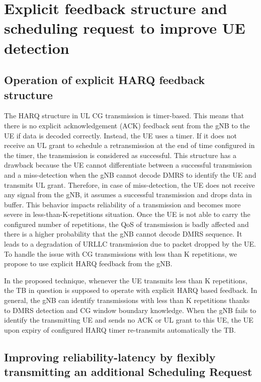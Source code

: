 \documentclass{report}
\begin{document}
\section{Explicit feedback structure and scheduling request to improve UE detection}\label{33}

\subsection{Operation of explicit HARQ feedback structure}\label{331}

The HARQ structure in UL CG transmission is timer-based. This means that there is no explicit acknowledgement (ACK) feedback sent from the gNB to the UE if data is decoded correctly. Instead, the UE uses a timer. If it does not receive an UL grant to schedule a retransmission at the end of time configured in the timer, the transmission is considered as successful. This structure has a drawback because the UE cannot differentiate between a successful transmission and a miss-detection when the gNB cannot decode DMRS to identify the UE and transmits UL grant. Therefore, in case of miss-detection, the UE does not receive any signal from the gNB, it assumes a successful transmission and drops data in buffer. This behavior impacts reliability of a transmission and becomes more severe in less-than-K-repetitions situation. Once the UE is not able to carry the configured number of repetitions, the QoS of transmission is badly affected and there is a higher probability that the gNB cannot decode DMRS sequence. It leads to a degradation of URLLC transmission due to packet dropped by the UE. To handle the issue with CG transmissions with less than K repetitions, we propose to use explicit HARQ feedback from the gNB. 

In the proposed technique, whenever the UE transmits less than K repetitions, the TB in question is supposed to operate with explicit HARQ based feedback. In general, the gNB can identify transmissions with less than K repetitions thanks to DMRS detection and CG window boundary knowledge. When the gNB fails to identify the transmitting UE and sends no ACK or UL grant to this UE, the UE upon expiry of configured HARQ timer re-transmits automatically the TB. 

\subsection{Improving reliability-latency by flexibly transmitting an additional Scheduling Request} \label{332}
\end{document}
